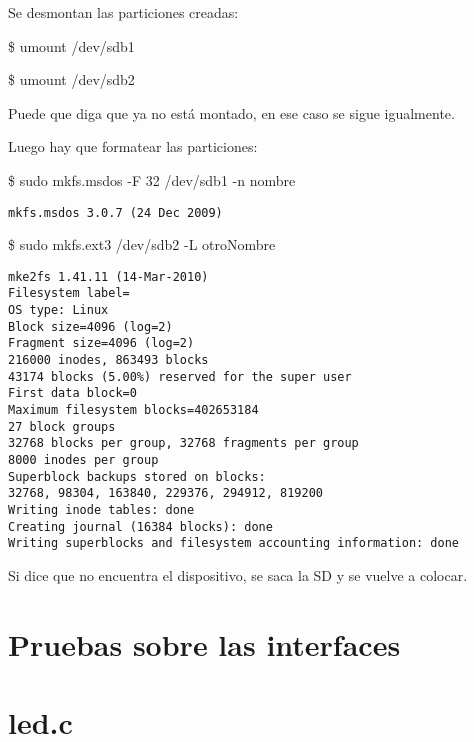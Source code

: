 Se desmontan las particiones creadas: 

\bigskip
\centerline{\$ umount /dev/sdb1}

\centerline{\$ umount /dev/sdb2}

\bigskip
Puede que diga que ya no está montado, en ese caso se sigue igualmente. 

\bigskip
Luego hay que formatear las particiones: 

\bigskip
\centerline{\$ sudo mkfs.msdos -F 32 /dev/sdb1 -n nombre}

\begin{verbatim}
mkfs.msdos 3.0.7 (24 Dec 2009) 
\end{verbatim}

\centerline{\$ sudo mkfs.ext3 /dev/sdb2 -L otroNombre}
\begin{verbatim}
mke2fs 1.41.11 (14-Mar-2010) 
Filesystem label= 
OS type: Linux 
Block size=4096 (log=2) 
Fragment size=4096 (log=2) 
216000 inodes, 863493 blocks 
43174 blocks (5.00%) reserved for the super user 
First data block=0 
Maximum filesystem blocks=402653184 
27 block groups 
32768 blocks per group, 32768 fragments per group 
8000 inodes per group 
Superblock backups stored on blocks: 
32768, 98304, 163840, 229376, 294912, 819200 
Writing inode tables: done 
Creating journal (16384 blocks): done 
Writing superblocks and filesystem accounting information: done
\end{verbatim}

\bigskip
Si dice que no encuentra el dispositivo, se saca la SD y se vuelve a colocar.


\section{Pruebas sobre las interfaces}

\section{led.c}\label{anx_sw_led}

